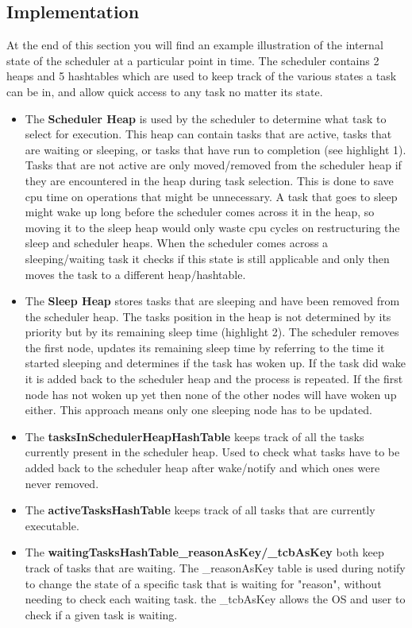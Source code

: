 \documentclass[12pt,a4paper]{article}
\begin{document}
\subsection{Implementation}
At the end of this section you will find an example illustration of the internal state of the scheduler at a particular point in time. The scheduler contains 2 heaps and 5 hashtables which are used to keep track of the various states a task can be in, and allow quick access to any task no matter its state.

\begin{itemize}
\setlength\itemsep{0.0em}
  \item The \textbf{Scheduler Heap} is used by the scheduler to determine what task to select for execution. This heap can contain tasks that are active,  tasks that are waiting or sleeping, or tasks that have run to completion (see highlight 1). Tasks that are not active are only moved/removed from the scheduler heap if they are encountered in the heap during task selection. This is done to save cpu time on operations that might be unnecessary. A task that goes to sleep might wake up long before the scheduler comes across it in the heap, so moving it to the sleep heap would only waste cpu cycles on restructuring the sleep and scheduler heaps. When the scheduler comes across a sleeping/waiting task it checks if this state is still applicable and only then moves the task to a different heap/hashtable.
  \item The \textbf{Sleep Heap} stores tasks that are sleeping and have been removed from the scheduler heap. The tasks position in the heap is not determined by its priority but by its remaining sleep time (highlight 2). The scheduler removes the first node, updates its remaining sleep time by referring to the time it started sleeping and determines if the task has woken up. If the task did wake it is added back to the scheduler heap and the process is repeated. If the first node has not woken up yet then none of the other nodes will have woken up either. This approach means only one sleeping node has to be updated.
  \item The \textbf{tasksInSchedulerHeapHashTable} keeps track of all the tasks currently present in the scheduler heap. Used to check what tasks have to be added back to the scheduler heap after wake/notify and which ones were never removed.
  \item The \textbf{activeTasksHashTable} keeps track of all tasks that are currently executable.
  \item The \textbf{waitingTasksHashTable\_reasonAsKey/\_tcbAsKey} both keep track of tasks that are waiting. The \_reasonAsKey table is used during notify to change the state of a specific task that is waiting for "reason", without needing to check each waiting task. the \_tcbAsKey allows the OS and user to check if a given task is waiting.

\end{itemize}
\end{document}
